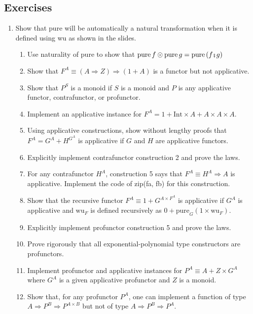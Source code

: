\subsection{Exercises}
\begin{enumerate}
\item \vspace{-0.15cm}Show that pure will be automatically a natural transformation
when it is defined using wu as shown in the slides.
\begin{enumerate}
\item Use naturality of pure to show that $\text{pure}\,f\odot\text{pure}\,g=\text{pure}\left(f\bef g\right)$
\item Show that $F^{A}\equiv\left(A\Rightarrow Z\right)\Rightarrow\left(1+A\right)$
is a functor but not applicative.
\item Show that $P^{S}$ is a monoid if $S$ is a monoid and $P$ is any
applicative functor, contrafunctor, or profunctor.
\item Implement an applicative instance for $F^{A}=1+\text{Int}\times A+A\times A\times A$.
\item Using applicative constructions, show without lengthy proofs that
$F^{A}=G^{A}+H^{G^{A}}$ is applicative if $G$ and $H$ are applicative
functors.
\item Explicitly implement contrafunctor construction 2 and prove the laws.
\item For any contrafunctor $H^{A}$, construction 5 says that $F^{A}\equiv H^{A}\Rightarrow A$
is applicative. Implement the code of zip(fa, fb) for this construction.
\item Show that the recursive functor $F^{A}\equiv1+G^{A\times F^{A}}$
is applicative if $G^{A}$ is applicative and $\text{wu}_{F}$ is
defined recursively as $0+\text{pure}_{G}\left(1\times\text{wu}_{F}\right)$.
\item Explicitly implement profunctor construction 5 and prove the laws. 
\item Prove rigorously that all exponential-polynomial type constructors
are profunctors.
\item Implement profunctor and applicative instances for $P^{A}\equiv A+Z\times G^{A}$
where $G^{A}$ is a given applicative profunctor and $Z$ is a monoid.
\item Show that, for any profunctor $P^{A}$, one can implement a function
of type $A\Rightarrow P^{B}\Rightarrow P^{A\times B}$ but not of
type $A\Rightarrow P^{B}\Rightarrow P^{A}$. 
\end{enumerate}
\end{enumerate}

